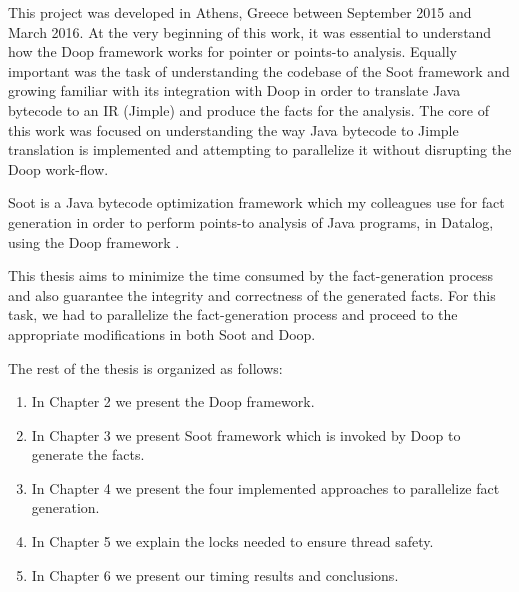 \documentclass{dithesis}
\begin{document}
\tableofcontents
\listoffigures
\listoftables



\begin{thesisprologue}[Preface]
    This project was developed in Athens, Greece between September 2015 and March 2016. At the very beginning of this work, it was essential to understand how the Doop framework works for pointer or points-to analysis. Equally important was the task of understanding the codebase of the Soot framework and growing familiar with its integration with Doop in order to translate Java bytecode to an IR (Jimple) and produce the facts for the analysis. The core of this work was focused on understanding the way Java bytecode to Jimple translation is implemented and attempting to parallelize it without disrupting the Doop work-flow.
\end{thesisprologue}

\newcommand{\tab}[1]{\hspace{.2\textwidth}\rlap{#1}}

	Soot \cite{Sable: Soot} is a Java bytecode optimization framework which my colleagues use for fact generation in order to perform points-to analysis \cite{Points-to Analysis} of Java programs, in Datalog, using the Doop framework \cite{Doop: Framework for Java Pointer Analysis}. 

	This thesis aims to minimize the time consumed by the fact-generation process and also guarantee the integrity and correctness of the generated facts. For this task, we had to parallelize the fact-generation process and proceed to the appropriate modifications in both Soot and Doop.

	The rest of the thesis is organized as follows:
	\begin{enumerate}
		\item In Chapter 2 we present the Doop framework.
		\item In Chapter 3 we present Soot framework which is invoked by Doop to generate the facts.
		\item In Chapter 4 we present the four implemented approaches to parallelize fact generation.
		\item In Chapter 5 we explain the locks needed to ensure thread safety.
		\item In Chapter 6 we present our timing results and conclusions.
	\end{enumerate}
\end{document}

